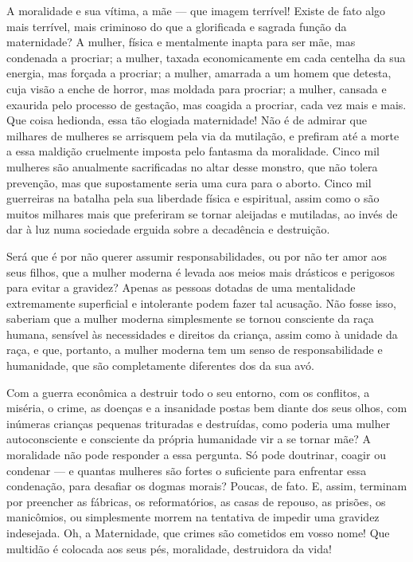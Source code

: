 A moralidade e sua vítima, a mãe --- que imagem terrível! Existe de fato
algo mais terrível, mais criminoso do que a glorificada e sagrada função
da maternidade? A mulher, física e mentalmente inapta para ser mãe, mas
condenada a procriar; a mulher, taxada economicamente em cada centelha
da sua energia, mas forçada a procriar; a mulher, amarrada a um homem
que detesta, cuja visão a enche de horror, mas moldada para procriar; a
mulher, cansada e exaurida pelo processo de gestação, mas coagida a
procriar, cada vez mais e mais. Que coisa hedionda, essa tão elogiada
maternidade! Não é de admirar que milhares de mulheres se arrisquem pela
via da mutilação, e prefiram até a morte a essa maldição cruelmente
imposta pelo fantasma da moralidade. Cinco mil mulheres são anualmente
sacrificadas no altar desse monstro, que não tolera prevenção, mas que
supostamente seria uma cura para o aborto. Cinco mil guerreiras na
batalha pela sua liberdade física e espiritual, assim como o são muitos
milhares mais que preferiram se tornar aleijadas e mutiladas, ao invés
de dar à luz numa sociedade erguida sobre a decadência e destruição.

Será que é por não querer assumir responsabilidades, ou por não ter amor
aos seus filhos, que a mulher moderna é levada aos meios mais drásticos
e perigosos para evitar a gravidez? Apenas as pessoas dotadas de uma
mentalidade extremamente superficial e intolerante podem fazer tal
acusação. Não fosse isso, saberiam que a mulher moderna
simplesmente se tornou consciente da raça humana, sensível às
necessidades e direitos da criança, assim como à unidade da raça, e que,
portanto, a mulher moderna tem um senso de responsabilidade e
humanidade, que são completamente diferentes dos da sua avó.

Com a guerra econômica a destruir todo o seu entorno, com os conflitos,
a miséria, o crime, as doenças e a insanidade postas bem diante dos seus
olhos, com inúmeras crianças pequenas trituradas e destruídas, como
poderia uma mulher autoconsciente e consciente da própria humanidade vir
a se tornar mãe? A moralidade não pode responder a essa pergunta. Só
pode doutrinar, coagir ou condenar --- e quantas mulheres são fortes o
suficiente para enfrentar essa condenação, para desafiar os dogmas
morais? Poucas, de fato. E, assim, terminam por preencher as fábricas,
os reformatórios, as casas de repouso, as prisões, os manicômios, ou
simplesmente morrem na tentativa de impedir uma gravidez indesejada. Oh,
a Maternidade, que crimes são cometidos em vosso nome! Que multidão é
colocada aos seus pés, moralidade, destruidora da vida!

